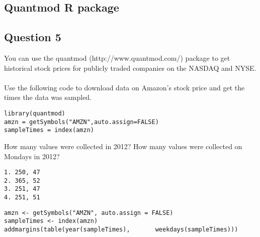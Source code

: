 \documentclass[]{article}
\begin{document}
\subsection*{Quantmod R package}
\newpage
\subsection*{Question 5}
You can use the quantmod (http://www.quantmod.com/) package to get historical stock prices for publicly traded companies on the NASDAQ and NYSE. \\
\\
Use the following code to download data on Amazon's stock price and get the times the data was sampled.
\begin{framed}
\begin{verbatim}
library(quantmod)
amzn = getSymbols("AMZN",auto.assign=FALSE)
sampleTimes = index(amzn) 
\end{verbatim}
\end{framed}
How many values were collected in 2012? How many values were collected on Mondays in 2012?
\begin{verbatim}
1. 250, 47
2. 365, 52
3. 251, 47
4. 251, 51
\end{verbatim}


\begin{framed}
\begin{verbatim}
amzn <- getSymbols("AMZN", auto.assign = FALSE)
sampleTimes <- index(amzn) 
addmargins(table(year(sampleTimes),       weekdays(sampleTimes)))
\end{verbatim}
\end{framed}
\end{document}
